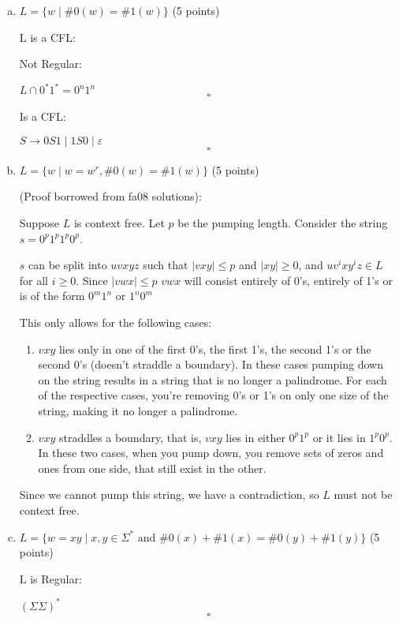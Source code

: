 \documentclass{article}
\begin{document}
            \begin{enumerate}[(a)]
            \item $L = \{w \;|\; \#0(w)=\#1(w)\}$ (5 points)

            L is a CFL:

            Not Regular:

            $L \cap {0^*1^*} = 0^n1^n$
            \[ \square \]

            Is a CFL:

            $S \rightarrow 0S1 \;|\; 1S0 \;|\; \varepsilon$
            \[ \square \]

            \item $L = \{w \;|\; w=w^r, \#0(w)=\#1(w)\}$ (5 points)

(Proof borrowed from fa08 solutions):

Suppose $L$ is context free. Let $p$ be the pumping length. Consider the string
$s = 0^p1^p1^p0^p$.

$s$ can be split into $uvxyz$ such that $|vxy| \leq p$ and $|xy| \geq 0$, and
$uv^ixy^iz \in L$ for all $i \geq 0$. Since $|vwx| \leq p$ $vwx$ will consist
entirely of 0's, entirely of 1's or is of the form $0^m1^n$ or $1^n0^m$

This only allows for the following cases:

\begin{enumerate}[{Case} 1:]

    \item $vxy$ lies only in one of the first 0's, the first 1's, the second 1's
    or the second 0's (doesn't straddle a boundary). In these cases pumping down
    on the string results in a string that is no longer a palindrome. For each
    of the respective cases, you're removing 0's or 1's on only one size of the
    string, making it no longer a palindrome.

    \item $vxy$ straddles a boundary, that is, $vxy$ lies in either $0^p1^p$ or
    it lies in $1^p0^p$. In these two cases, when you pump down, you remove sets
    of zeros and ones from one side, that still exist in the other.

\end{enumerate}

Since we cannot pump this string, we have a contradiction, so $L$ must not be
context free.

            \item $L = \{w=xy \;|\; x,y\in\Sigma^* \text{ and } \#0(x)+\#1(x)=\#0(y)+\#1(y)\}$ (5 points)

            L is Regular:

            $(\Sigma\Sigma)^*$
            \[ \square \]

            \end{enumerate}
            \newpage
\end{document}
